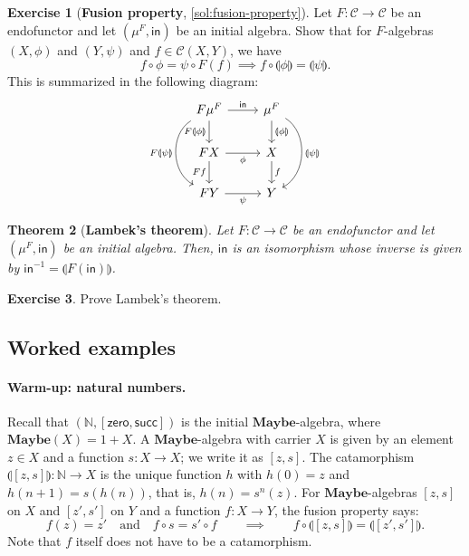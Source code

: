 \documentclass[a4paper,11pt, oneside,titlepage=false]{scrbook}
\theoremstyle{plain}
\newtheorem{thm}{Theorem}
\theoremstyle{definition}
\newtheorem{exer}[thm]{Exercise}
\newcommand{\Cat}[1]{\mathcal{#1}}
\newcommand{\CC}{\Cat{C}}
\newcommand{\Catb}[1]{\mathbf{#1}}
\newcommand{\Maybe}{\Catb{Maybe}}
\newcommand{\CHom}[3]{{#1}(#2,#3)}
\newcommand{\Initalg}[1]{\ensuremath{\mu^{#1}}}
\newcommand{\Inv}[1]{#1 ^{-1}}
\newcommand{\catam}[1]{\llparenthesis #1 \rrparenthesis}
\newcommand{\In}{\ensuremath{\mathsf{in}}}
\newcommand{\co}[2]{\ensuremath{#2 \circ #1}}
\newcommand{\NN}{\ensuremath{\mathbb{N}}}
\newcommand{\Zero}{\ensuremath{\mathsf{zero}}}
\newcommand{\Succ}{\ensuremath{\mathsf{succ}}}
\begin{document}
\begin{exer}[\textbf{Fusion property}, \cref{sol:fusion-property}]\label{exer:fusion-property}
  Let $F:\CC\to\CC$ be an endofunctor and let $(\Initalg F, \In)$ be an initial algebra. Show that
  for $F$-algebras $(X,\phi)$ and $(Y,\psi)$ and $f\in\CHom{\CC}{X}{Y}$, we have
\[
\co{\phi}{f} = \co{F(f)}{\psi} \implies \co{\catam{\phi}}{f} = \catam{\psi}.
\]
This is summarized in the following diagram:
\begin{equation}\label{eq:initial-f-alg-composition}
\begin{tikzcd}
F\Initalg{F}
\arrow[r, "\In"]
\arrow[d,swap, "F\catam{\phi}"]
\ar[dd, bend right=60, "F\catam{\psi}"']
&
\Initalg{F}
\arrow[d, "\catam{\phi}"]
\ar[dd, bend left=60, "\catam{\psi}"]
\\
FX
\arrow[r, swap, "\phi"]
\ar[d, "Ff"']
&
X \ar[d, "f"]
\\
FY \ar[r, "\psi"']
&
Y
\end{tikzcd}
\end{equation}
\end{exer}

\begin{thm}[\textbf{Lambek's theorem}]
  Let $F:\CC\to\CC$ be an endofunctor and let $(\mu^F, \In)$ be an initial algebra. Then, $\In$ is an isomorphism whose inverse is given by $\Inv{\In} = \catam{F(\In)}$.
\end{thm}

\begin{exer}
  Prove Lambek's theorem.
\end{exer}

\subsection{Worked examples}\label{sec:fusion-examples}

\paragraph{Warm-up: natural numbers.}
Recall that $(\NN, [\Zero, \Succ])$ is the initial $\Maybe$-algebra, where $\Maybe(X) = 1 + X$.
A $\Maybe$-algebra with carrier $X$ is given by an element $z \in X$ and a function $s : X \to X$; we write it as $[z, s]$.
The catamorphism $\catam{[z,s]} : \NN \to X$ is the unique function $h$ with $h(0) = z$ and $h(n + 1) = s(h(n))$, that is, $h(n) = s^n(z)$.
For $\Maybe$-algebras $[z, s]$ on $X$ and $[z', s']$ on $Y$ and a function $f : X \to Y$, the fusion property says:
\begin{equation}\label{eq:nat-fusion}
  f(z) = z' \quad\text{and}\quad f \circ s = s' \circ f
  \qquad\implies\qquad
  f \circ \catam{[z,s]} = \catam{[z', s']}.
\end{equation}
Note that $f$ itself does not have to be a catamorphism.
\end{document}

